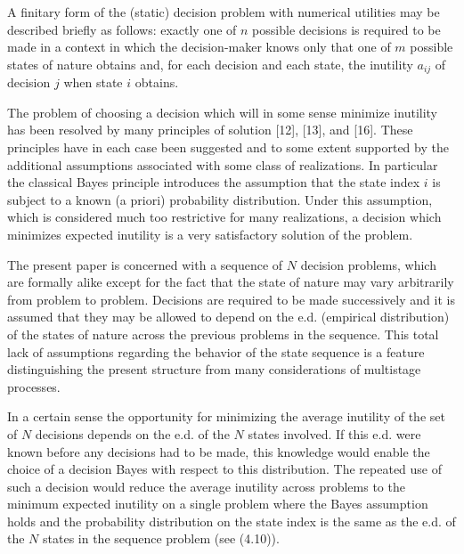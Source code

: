 \documentclass[11pt]{article}
\theoremstyle{boldStyle}
\begin{document}
A finitary form of the (static) decision problem with numerical utilities may be described briefly as follows: exactly one of \( n \) possible decisions is 
required to be made in a context in which the decision-maker knows only that one of \( m \) possible states of nature obtains and, 
for each decision and each state, the inutility \( a_{ij} \) of decision \( j \) when state \( i \) obtains.

\medbreak

The problem of choosing a decision which will in some sense minimize inutility has been resolved by many principles of solution [12], [13], and [16]. 
These principles have in each case been suggested and to some extent supported by the additional assumptions associated with some class of realizations. 
In particular the classical Bayes principle introduces the assumption that the state index \( i \) is subject to a known (a priori) probability distribution. 
Under this assumption, which is considered much too restrictive for many realizations, a decision which minimizes expected inutility is a very 
satisfactory solution of the problem.

\medbreak

The present paper is concerned with a sequence of \( N \) decision problems, which are formally alike except for the fact that the state of nature may 
vary arbitrarily from problem to problem. Decisions are required to be made successively and it is assumed that they may be allowed to depend on the e.d.
 (empirical distribution) of the states of nature across the previous problems in the sequence. 
 This total lack of assumptions regarding the behavior of the state sequence is a feature distinguishing the present structure from many 
 considerations of multistage processes.

\medbreak

In a certain sense the opportunity for minimizing the average inutility of the set of \( N \) decisions depends on the e.d. of the \( N \) states involved. 
If this e.d. were known before any decisions had to be made, this knowledge would enable the choice of a decision Bayes with respect to this distribution. 
The repeated use of such a decision would reduce the average inutility across problems to the minimum expected inutility on a single problem where the 
Bayes assumption holds and the probability distribution on the state index is the same as the e.d. of the \( N \) states in the sequence problem (see (4.10)).

\medbreak
\end{document}
